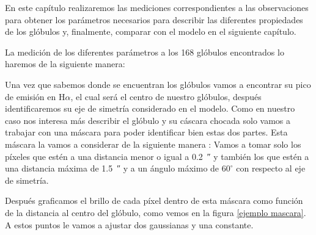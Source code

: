 \documentclass{book}
\begin{document}
En este capítulo realizaremos las mediciones correspondientes a las observaciones para obtener los parámetros necesarios para describir las diferentes propiedades de los glóbulos y, finalmente, comparar con el modelo en el siguiente capítulo.

La medición de los diferentes parámetros a los 168 glóbulos encontrados lo haremos de la siguiente manera:

Una vez que sabemos donde se encuentran los glóbulos vamos a encontrar su pico de emisión en H$\alpha$, el cual será el centro de nuestro glóbulos, después identificaremos su eje de simetría considerado en el modelo. Como en nuestro caso nos interesa más describir el glóbulo y su cáscara chocada solo vamos a trabajar con una máscara para poder identificar bien estas dos partes. Esta máscara la vamos a considerar de la siguiente manera : Vamos a tomar solo los píxeles que estén a una distancia menor o igual a \SI{0.2}{\arcsecond} y también los que estén a una distancia máxima de \SI{1.5}{\arcsecond} y a un ángulo máximo de $60^\circ$ con respecto al eje de simetría. 

Después graficamos el brillo de cada píxel dentro de esta máscara como función de la distancia al centro del glóbulo, como vemos en la figura \ref{ejemplo mascara}. A estos puntos le vamos a ajustar dos gaussianas y una constante.
\end{document}
